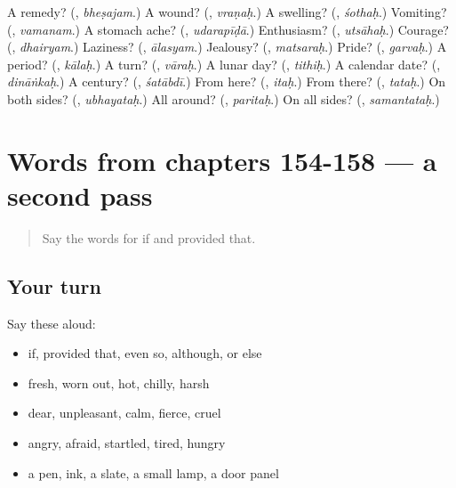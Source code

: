 \begin{tcolorbox}[breakable,colback=teal!4,colframe=teal!35!black,title={Before you move on}]
A remedy? (\textbf{}, \emph{bheṣajam}.) A wound? (\textbf{}, \emph{vraṇaḥ}.) A swelling? (\textbf{}, \emph{śothaḥ}.) Vomiting? (\textbf{}, \emph{vamanam}.) A stomach ache? (\textbf{}, \emph{udarapīḍā}.) Enthusiasm? (\textbf{}, \emph{utsāhaḥ}.) Courage? (\textbf{}, \emph{dhairyam}.) Laziness? (\textbf{}, \emph{ālasyam}.) Jealousy? (\textbf{}, \emph{matsaraḥ}.) Pride? (\textbf{}, \emph{garvaḥ}.) A period? (\textbf{}, \emph{kālaḥ}.) A turn? (\textbf{}, \emph{vāraḥ}.) A lunar day? (\textbf{}, \emph{tithiḥ}.) A calendar date? (\textbf{}, \emph{dināṅkaḥ}.) A century? (\textbf{}, \emph{śatābdī}.) From here? (\textbf{}, \emph{itaḥ}.) From there? (\textbf{}, \emph{tataḥ}.) On both sides? (\textbf{}, \emph{ubhayataḥ}.) All around? (\textbf{}, \emph{paritaḥ}.) On all sides? (\textbf{}, \emph{samantataḥ}.)
\end{tcolorbox}
\section[(dialogue)]{Words from chapters 154-158 — a second pass}

\label{lesson:SA-R158-second-pass-words-from-chapters-154-158}



\begin{quote}
Say the words for if and provided that.
\end{quote}

\subsection*{Your turn}
Say these aloud:

\begin{itemize}
\raggedright
  \item if, provided that, even so, although, or else
  \item fresh, worn out, hot, chilly, harsh
  \item dear, unpleasant, calm, fierce, cruel
  \item angry, afraid, startled, tired, hungry
  \item a pen, ink, a slate, a small lamp, a door panel
\end{itemize}

